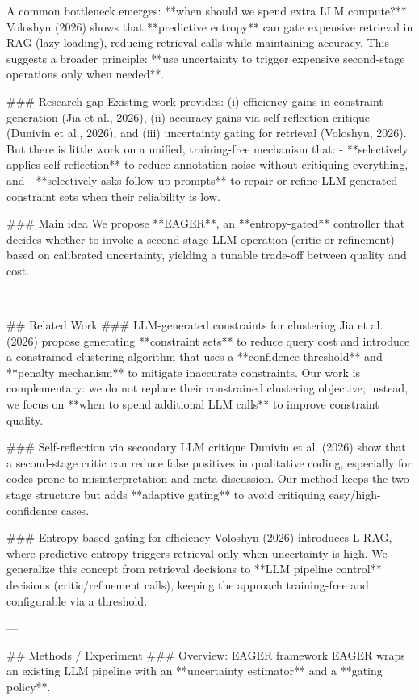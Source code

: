 A common bottleneck emerges: **when should we spend extra LLM compute?** Voloshyn (2026) shows that **predictive entropy** can gate expensive retrieval in RAG (lazy loading), reducing retrieval calls while maintaining accuracy. This suggests a broader principle: **use uncertainty to trigger expensive second-stage operations only when needed**.

### Research gap
Existing work provides: (i) efficiency gains in constraint generation (Jia et al., 2026), (ii) accuracy gains via self-reflection critique (Dunivin et al., 2026), and (iii) uncertainty gating for retrieval (Voloshyn, 2026). But there is little work on a unified, training-free mechanism that:
- **selectively applies self-reflection** to reduce annotation noise without critiquing everything, and
- **selectively asks follow-up prompts** to repair or refine LLM-generated constraint sets when their reliability is low.

### Main idea
We propose **EAGER**, an **entropy-gated** controller that decides whether to invoke a second-stage LLM operation (critic or refinement) based on calibrated uncertainty, yielding a tunable trade-off between quality and cost.

---

## Related Work
### LLM-generated constraints for clustering
Jia et al. (2026) propose generating **constraint sets** to reduce query cost and introduce a constrained clustering algorithm that uses a **confidence threshold** and **penalty mechanism** to mitigate inaccurate constraints. Our work is complementary: we do not replace their constrained clustering objective; instead, we focus on **when to spend additional LLM calls** to improve constraint quality.

### Self-reflection via secondary LLM critique
Dunivin et al. (2026) show that a second-stage critic can reduce false positives in qualitative coding, especially for codes prone to misinterpretation and meta-discussion. Our method keeps the two-stage structure but adds **adaptive gating** to avoid critiquing easy/high-confidence cases.

### Entropy-based gating for efficiency
Voloshyn (2026) introduces L-RAG, where predictive entropy triggers retrieval only when uncertainty is high. We generalize this concept from retrieval decisions to **LLM pipeline control** decisions (critic/refinement calls), keeping the approach training-free and configurable via a threshold.

---

## Methods / Experiment
### Overview: EAGER framework
EAGER wraps an existing LLM pipeline with an **uncertainty estimator** and a **gating policy**.

